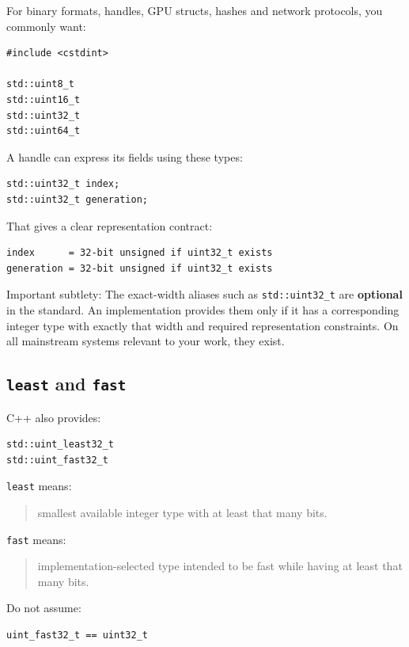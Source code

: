 For binary formats, handles, GPU structs, hashes and network protocols, you commonly want:

\begin{verbatim}
#include <cstdint>

std::uint8_t
std::uint16_t
std::uint32_t
std::uint64_t
\end{verbatim}

A handle can express its fields using these types:

\begin{verbatim}
std::uint32_t index;
std::uint32_t generation;
\end{verbatim}

That gives a clear representation contract:

\begin{verbatim}
index      = 32-bit unsigned if uint32_t exists
generation = 32-bit unsigned if uint32_t exists
\end{verbatim}

Important subtlety: The exact-width aliases such as \texttt{std::uint32\_t} are \textbf{optional} in the standard. An implementation provides them only if it has a corresponding integer type with exactly that width and required representation constraints. On all mainstream systems relevant to your work, they exist.

\subsection{\texorpdfstring{\texttt{least} and \texttt{fast}}{least and fast}}\label{01-foundations-i-ch002-least-and-fast}

C++ also provides:

\begin{verbatim}
std::uint_least32_t
std::uint_fast32_t
\end{verbatim}

\texttt{least} means:

\begin{quote}
smallest available integer type with at least that many bits.
\end{quote}

\texttt{fast} means:

\begin{quote}
implementation-selected type intended to be fast while having at least that many bits.
\end{quote}

Do not assume:

\begin{verbatim}
uint_fast32_t == uint32_t
\end{verbatim}

